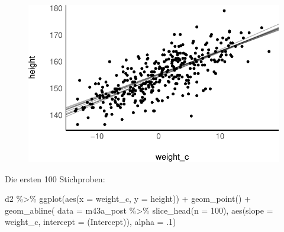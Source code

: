 \documentclass[
  a4paper,
  DIV=11]{scrreprt}
\newenvironment{Shaded}{\begin{snugshade}}{\end{snugshade}}
\newcommand{\AttributeTok}[1]{\textcolor[rgb]{0.40,0.45,0.13}{#1}}
\newcommand{\DecValTok}[1]{\textcolor[rgb]{0.68,0.00,0.00}{#1}}
\newcommand{\FunctionTok}[1]{\textcolor[rgb]{0.28,0.35,0.67}{#1}}
\newcommand{\NormalTok}[1]{\textcolor[rgb]{0.00,0.23,0.31}{#1}}
\newcommand{\SpecialCharTok}[1]{\textcolor[rgb]{0.37,0.37,0.37}{#1}}
\newcommand{\StringTok}[1]{\textcolor[rgb]{0.13,0.47,0.30}{#1}}
\theoremstyle{definition}
\theoremstyle{remark}
\begin{document}
\begin{figure}[H]

{\centering \includegraphics{./lineare-modelle_files/figure-pdf/Post-Regression-befragen-10-1.pdf}

}

\end{figure}

Die ersten 100 Stichproben:

\begin{Shaded}
\begin{Highlighting}[]
\NormalTok{d2 }\SpecialCharTok{\%\textgreater{}\%} 
  \FunctionTok{ggplot}\NormalTok{(}\FunctionTok{aes}\NormalTok{(}\AttributeTok{x =}\NormalTok{ weight\_c, }
             \AttributeTok{y =}\NormalTok{ height)) }\SpecialCharTok{+}
  \FunctionTok{geom\_point}\NormalTok{() }\SpecialCharTok{+}
  \FunctionTok{geom\_abline}\NormalTok{(}
    \AttributeTok{data =}\NormalTok{ m43a\_post }\SpecialCharTok{\%\textgreater{}\%} 
      \FunctionTok{slice\_head}\NormalTok{(}\AttributeTok{n =} \DecValTok{100}\NormalTok{),}
     \FunctionTok{aes}\NormalTok{(}\AttributeTok{slope =}\NormalTok{ weight\_c,}
        \AttributeTok{intercept =} \StringTok{\textasciigrave{}}\AttributeTok{(Intercept)}\StringTok{\textasciigrave{}}\NormalTok{),}
    \AttributeTok{alpha =}\NormalTok{ .}\DecValTok{1}\NormalTok{)}
\end{Highlighting}
\end{Shaded}
\end{document}
